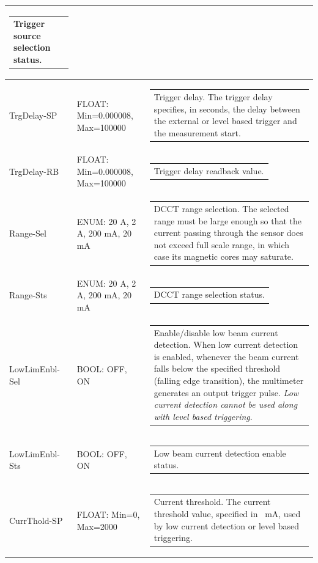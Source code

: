 \documentclass[openany]{article}
\begin{document}
\begin{longtable}{| m{3.0cm} m{4.5cm} m{7.0cm} |}
\begin{tabular}{@{}m{6cm}@{}}
	    					Trigger source selection status.
						\end{tabular} \\ \hline
		TrgDelay-SP & FLOAT: Min=0.000008, Max=100000 & \begin{tabular}{@{}m{6cm}@{}}
	    					Trigger delay. The trigger delay specifies, in seconds, the delay between the external or level based trigger and the measurement start.
						\end{tabular} \\ \hline
		TrgDelay-RB & FLOAT: Min=0.000008, Max=100000 & \begin{tabular}{@{}m{6cm}@{}}
	    					Trigger delay readback value.
						\end{tabular} \\ \hline
		Range-Sel & ENUM: 20 A, 2 A, 200 mA, 20 mA & \begin{tabular}{@{}m{6cm}@{}}
	    					DCCT range selection. The selected range must be large enough so that the current passing through the sensor does not exceed full scale range, in which case its magnetic cores may saturate.
						\end{tabular} \\ \hline
		Range-Sts & ENUM: 20 A, 2 A, 200 mA, 20 mA & \begin{tabular}{@{}m{6cm}@{}}
	    					DCCT range selection status.
						\end{tabular} \\ \hline
		LowLimEnbl-Sel & BOOL: OFF, ON & \begin{tabular}{@{}m{6cm}@{}}
	    					Enable/disable low beam current detection. When low current detection is enabled, whenever the beam current falls below the specified threshold (falling edge transition), the multimeter generates an output trigger pulse. \emph{Low current detection cannot be used along with level based triggering}.
						\end{tabular} \\ \hline
		LowLimEnbl-Sts & BOOL: OFF, ON & \begin{tabular}{@{}m{6cm}@{}}
	    					Low beam current detection enable status.
						\end{tabular} \\ \hline
		CurrThold-SP & FLOAT: Min=0, Max=2000 & \begin{tabular}{@{}m{6cm}@{}}
	    					Current threshold. The current threshold value, specified in \SI{}{\milli\ampere}, used by low current detection or level based triggering.

\end{tabular}
\end{longtable}
\end{document}
